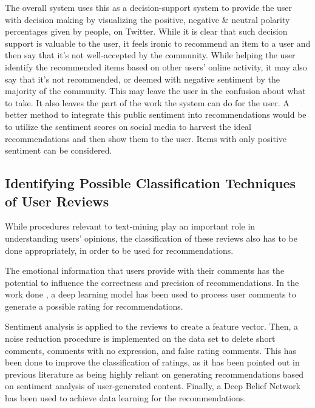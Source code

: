 \documentclass[manuscript,screen,natbib=false]{acmart}
\begin{document}
The overall system uses this as a decision-support system to provide the user with decision making by visualizing the positive, negative \& neutral polarity percentages given by people, on Twitter. While it is clear that such decision support is valuable to the user, it feels ironic to recommend an item to a user and then say that it's not well-accepted by the community. While helping the user identify the recommended items based on other users' online activity, it may also say that it's not recommended, or deemed with negative sentiment by the majority of the community. This may leave the user in the confusion about what to take. It also leaves the part of the work the system can do for the user. A better method to integrate this public sentiment into recommendations would be to utilize the sentiment scores on social media to harvest the ideal recommendations and then show them to the user. Items with only positive sentiment can be considered.


\subsection{Identifying Possible Classification Techniques of User Reviews}

While procedures relevant to text-mining play an important role in understanding users' opinions, the classification of these reviews also has to be done appropriately, in order to be used for recommendations.

The emotional information that users provide with their comments has the potential to influence the correctness and precision of recommendations. In the work done \cite{chen_user_2019}, a deep learning model has been used to process user comments to generate a possible rating for recommendations.

Sentiment analysis is applied to the reviews to create a feature vector. Then, a noise reduction procedure is implemented on the data set to delete short comments, comments with no expression, and false rating comments. This has been done to improve the classification of ratings, as it has been pointed out in previous literature\cite{cheng_hybrid_2020} as being highly reliant on generating recommendations based on sentiment analysis of user-generated content. Finally, a Deep Belief Network has been used to achieve data learning for the recommendations.
\end{document}
